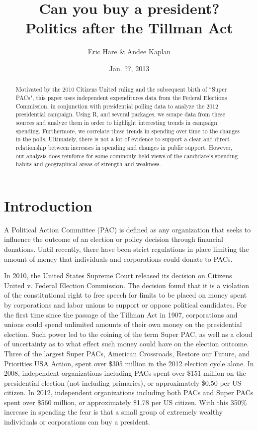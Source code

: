 \documentclass[11pt]{article}\usepackage{graphicx, color}
\begin{document}
\setlength{\parskip}{3ex}
\setlength{\parindent}{0pt}

\title{Can you buy a president? \\ \vspace{.6cm} \Large Politics after the Tillman Act}
\author{Eric Hare \& Andee Kaplan}
\date{Jan. ??, 2013}

\maketitle
\thispagestyle{empty}
\begin{abstract}
Motivated by the 2010 Citizens United ruling and the subsequent birth of ``Super PACs", this paper uses independent expenditures data from the Federal Elections Commission, in conjunction with presidential polling data to analyze the 2012 presidential campaign. Using R, and several packages, we scrape data from these sources and analyze them in order to highlight interesting trends in campaign spending. Furthermore, we correlate these trends in spending over time to the changes in the polls. Ultimately, there is not a lot of evidence to support a clear and direct relationship between increases in spending and changes in public support. However, our analysis does reinforce for some commonly held views of the candidate's spending habits and geographical areas of strength and weakness.
\end{abstract}
\clearpage

\setcounter{page}{1}
\section{Introduction}
A Political Action Committee (PAC) is defined as any organization that seeks to influence the outcome of an election or policy decision through financial donations. Until recently, there have been strict regulations in place limiting the amount of money that individuals and corporations could donate to PACs.

In 2010, the United States Supreme Court released its decision on Citizens United v. Federal Election Commission. The decision found that it is a violation of the constitutional right to free speech for limits to be placed on money spent by corporations and labor unions to support or oppose political candidates. For the first time since the passage of the Tillman Act in 1907, corporations and unions could spend unlimited amounts of their own money on the presidential election. Such power led to the coining of the term Super PAC, as well as a cloud of uncertainty as to what effect such money could have on the election outcome. Three of the largest Super PACs, American Crossroads, Restore our Future, and Priorities USA Action, spent over \$305 million in the 2012 election cycle alone. In 2008, independent organizations including PACs spent over \$151 million on the presidential election (not including primaries), or approximately \$0.50 per US citizen. In 2012, independent organizations including both PACs and Super PACs spent over \$560 million, or approximately \$1.78 per US citizen. With this 350\% increase in spending the fear is that a small group of extremely wealthy individuals or corporations can buy a president.
\end{document}
